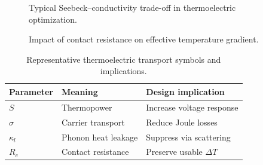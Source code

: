 \begin{figure}[htbp]
\centering
{}
\caption{Typical Seebeck--conductivity trade-off in thermoelectric optimization.}
\label{fig:te_tradeoff}
\end{figure}

\begin{figure}[htbp]
\centering
{}
\caption{Impact of contact resistance on effective temperature gradient.}
\label{fig:contact_resistance}
\end{figure}

\begin{table}[htbp]
\centering
\caption{Representative thermoelectric transport symbols and implications.}
\label{tab:te_symbols}
\begin{tabular}{lll}
\toprule
Parameter & Meaning & Design implication \\
\midrule
$S$ & Thermopower & Increase voltage response \\
$\sigma$ & Carrier transport & Reduce Joule losses \\
$\kappa_l$ & Phonon heat leakage & Suppress via scattering \\
$R_c$ & Contact resistance & Preserve usable $\Delta T$ \\
\bottomrule
\end{tabular}
\end{table}
